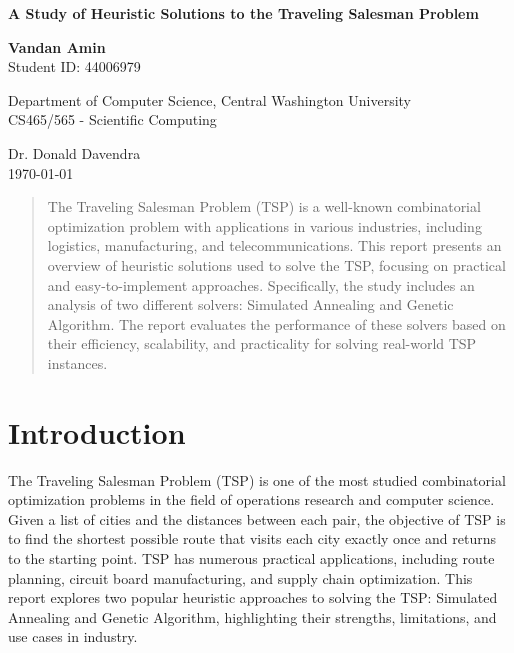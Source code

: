 \documentclass[a4paper,12pt]{report}
\begin{document}
\begin{titlepage}
    \centering
    \vspace*{2cm}
    
    \Huge
    \textbf{A Study of Heuristic Solutions to the Traveling Salesman Problem}
    
    \vspace{1.5cm}
    
    \Large
    \textbf{Vandan Amin} \\
    Student ID: 44006979
    
    \vspace{0.5cm}
    Department of Computer Science, Central Washington University
    \\ CS465/565 - Scientific Computing

    \vspace{0.5cm}
    Dr. Donald Davendra
    \\ \today
    \vfill

\end{titlepage}

\tableofcontents

\newpage
\begin{abstract}
    The Traveling Salesman Problem (TSP) is a well-known combinatorial optimization problem with applications in various industries, including logistics, manufacturing, and telecommunications. This report presents an overview of heuristic solutions used to solve the TSP, focusing on practical and easy-to-implement approaches. Specifically, the study includes an analysis of two different solvers: Simulated Annealing and Genetic Algorithm. The report evaluates the performance of these solvers based on their efficiency, scalability, and practicality for solving real-world TSP instances.
\end{abstract}

\newpage

\section{Introduction}
The Traveling Salesman Problem (TSP) is one of the most studied combinatorial optimization problems in the field of operations research and computer science. Given a list of cities and the distances between each pair, the objective of TSP is to find the shortest possible route that visits each city exactly once and returns to the starting point. TSP has numerous practical applications, including route planning, circuit board manufacturing, and supply chain optimization. This report explores two popular heuristic approaches to solving the TSP: Simulated Annealing and Genetic Algorithm, highlighting their strengths, limitations, and use cases in industry.
\end{document}
